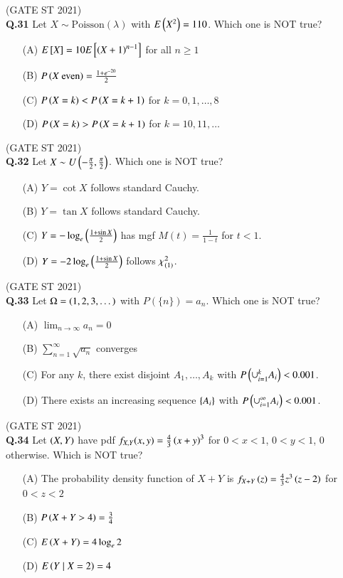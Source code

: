 \documentclass[journal,12pt,onecolumn]{IEEEtran}
\theoremstyle{remark}
\begin{document}
\hfill (GATE ST 2021) \\
\textbf{Q.31}
Let $X \sim \text{Poisson}(\lambda)$ with $E\left(X^2\right) = 110$. Which one is NOT true?
\begin{enumerate}
\item[(A)] $E{}\left[X\right] = 10 E{}\left[\left(X+1\right)^{n-1}\right]$ for all $n \ge 1$
\item[(B)] $P\left(X \ \text{even}\right) = \frac{1 + e^{-20}}{2}$
\item[(C)] $P\left(X = k\right) < P\left(X = k+1\right)$ for $k = 0, 1, \dots, 8$
\item[(D)] $P\left(X = k\right) > P\left(X = k+1\right)$ for $k = 10, 11, \dots$
\end{enumerate}

\hfill (GATE ST 2021) \\
\textbf{Q.32}
Let $X \sim U\left(-\frac{\pi}{2}, \frac{\pi}{2}\right)$. Which one is NOT true?
\begin{enumerate}
\item[(A)] $Y = \cot X$ follows standard Cauchy.
\item[(B)] $Y = \tan X$ follows standard Cauchy.
\item[(C)] $Y = -\log_e \left(\frac{1+ \sin X}{2}\right)$ has mgf $M(t) = \frac{1}{1-t}$ for $t<1$.
\item[(D)] $Y = -2\log_e\left( \frac{1 + \sin X}{2} \right)$ follows $\chi^2_{\left(1\right)}$.
\end{enumerate}

\hfill (GATE ST 2021) \\
\textbf{Q.33}
Let $\Omega = \left(1,2,3,\dots\right)$ with $P(\{n\}) = a_n$. Which one is NOT true?
\begin{enumerate}
\item[(A)] $\lim_{n\to\infty} a_n = 0$
\item[(B)] $\sum_{n=1}^\infty \sqrt{a_n}$ converges
\item[(C)] For any $k$, there exist disjoint $A_1, \dots, A_k$ with $P\left(\cup_{i=1}^k A_i\right) < 0.001$.
\item[(D)] There exists an increasing sequence $\left\{A_i\right\}$ with $P\left(\cup_{i=1}^\infty A_i\right) < 0.001$.
\end{enumerate}

\hfill (GATE ST 2021) \\
\textbf{Q.34}
Let $\left(X,Y\right)$ have pdf $f_{X,Y}(x,y) = \frac{4}{3}\left(x+y\right)^3$ for $0 < x < 1$, $0 < y < 1$, $0$ otherwise. Which is NOT true?
\begin{enumerate}
\item[(A)] The probability density function of $X+Y$ is $f_{X+Y}\left(z\right) = \frac{4}{3} z^3 \left(z-2\right)$ for $0<z<2$
\item[(B)] $P\left(X+Y > 4\right) = \frac{3}{4}$
\item[(C)] $E\left(X+Y\right) = 4 \log_e 2$
\item[(D)] $E\left(Y \mid X=2\right) = 4$
\end{enumerate}
\end{document}

